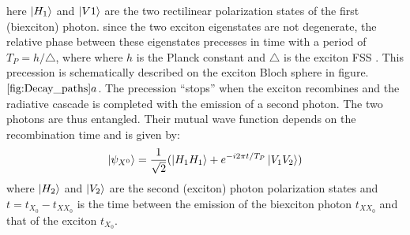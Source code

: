 here $\ket{H_1}$ and $\ket{V1}$ are the two rectilinear polarization states of the first (biexciton) photon. since the two exciton eigenstates are not degenerate, the relative phase between these eigenstates precesses in time with a period of $T_P = h/\triangle$, where where $h$ is the Planck constant and $\triangle$ is the exciton FSS \cite{rwinik2017}.
This precession is schematically described on the exciton Bloch sphere in figure. $\ref{fig:Decay_paths}a$.
The precession “stops” when the exciton recombines and the radiative cascade is completed with the emission of a second photon. The two photons are thus entangled. Their mutual wave function depends on the recombination time and is given by:
\begin{equation}
	\ket{\psi_{X^0}} = \frac{1}{\sqrt{2}}(\ket{H_1H_1} +e^{-i2\pi t/T_P}\ket{V_1V_2})
\end{equation}
where $\ket{H_2}$ and $\ket{V_2}$ are the second (exciton) photon polarization states and $t = t_{X_0} - t_{{XX}_0}$ is the time between the emission of the biexciton photon $t_{{XX}_0}$ and that of the exciton $t_{X_0}$.


